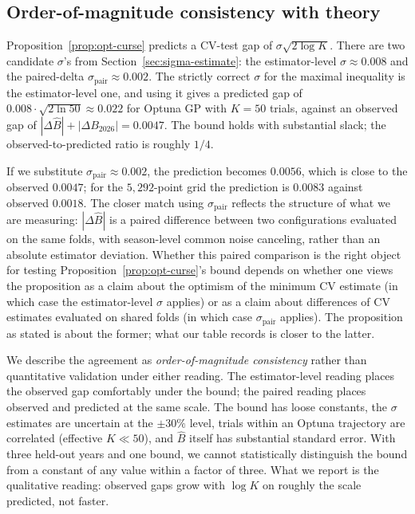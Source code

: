 \documentclass[11pt,a4paper]{article}
\theoremstyle{definition}
\begin{document}
\subsection{Order-of-magnitude consistency with theory}\label{sec:opt-match}

Proposition~\ref{prop:opt-curse} predicts a CV-test gap of $\sigma \sqrt{2 \log K}$. There are two candidate $\sigma$'s from Section~\ref{sec:sigma-estimate}: the estimator-level $\sigma \approx 0.008$ and the paired-delta $\sigma_{\text{pair}} \approx 0.002$. The strictly correct $\sigma$ for the maximal inequality is the estimator-level one, and using it gives a predicted gap of $0.008 \cdot \sqrt{2 \ln 50} \approx 0.022$ for Optuna GP with $K = 50$ trials, against an observed gap of $|\Delta \hat{B}| + |\Delta B_{2026}| = 0.0047$. The bound holds with substantial slack; the observed-to-predicted ratio is roughly $1/4$.

If we substitute $\sigma_{\text{pair}} \approx 0.002$, the prediction becomes $0.0056$, which is close to the observed $0.0047$; for the $5{,}292$-point grid the prediction is $0.0083$ against observed $0.0018$. The closer match using $\sigma_{\text{pair}}$ reflects the structure of what we are measuring: $|\Delta \hat{B}|$ is a paired difference between two configurations evaluated on the same folds, with season-level common noise canceling, rather than an absolute estimator deviation. Whether this paired comparison is the right object for testing Proposition~\ref{prop:opt-curse}'s bound depends on whether one views the proposition as a claim about the optimism of the minimum CV estimate (in which case the estimator-level $\sigma$ applies) or as a claim about differences of CV estimates evaluated on shared folds (in which case $\sigma_{\text{pair}}$ applies). The proposition as stated is about the former; what our table records is closer to the latter.

We describe the agreement as \emph{order-of-magnitude consistency} rather than quantitative validation under either reading. The estimator-level reading places the observed gap comfortably under the bound; the paired reading places observed and predicted at the same scale. The bound has loose constants, the $\sigma$ estimates are uncertain at the $\pm 30\%$ level, trials within an Optuna trajectory are correlated (effective $K \ll 50$), and $\hat{B}$ itself has substantial standard error. With three held-out years and one bound, we cannot statistically distinguish the bound from a constant of any value within a factor of three. What we report is the qualitative reading: observed gaps grow with $\log K$ on roughly the scale predicted, not faster.
\end{document}
